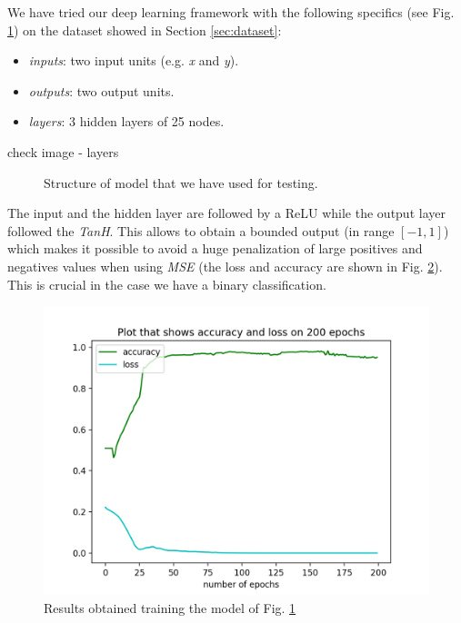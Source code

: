 \documentclass[journal, a4paper]{IEEEtran}
\begin{document}
We have tried our deep learning framework with the following specifics (see Fig. \ref{fig:res}) on the dataset showed in Section \ref{sec:dataset}:
\begin{itemize}
    \item \textit{inputs}: two input units (e.g. \textit{x} and \textit{y}).
    \item \textit{outputs}: two output units.
    \item \textit{layers}: 3 hidden layers of 25 nodes.
\end{itemize}
{\Huge{check image - layers}}
\begin {figure}[h!]
\centering
{}
\caption{Structure of model that we have used for testing.}
\label{fig:res}
\end{figure}
The input and the hidden layer are followed by a ReLU while the output layer followed the \textit{TanH}. This allows to obtain a bounded output (in range $[-1, 1]$) which makes it possible to avoid a huge penalization of large positives and negatives values when using \textit{MSE} (the loss and accuracy are shown in Fig. \ref{fig:plot}). This is crucial in the case we have a binary classification.
\begin{figure}[!h]
    \centering
    \includegraphics[width=0.9\linewidth]{Figure_1.png}
    \caption{Results obtained training the model of Fig. \ref{fig:res}}
    \label{fig:plot}
\end{figure}
\end{document}
